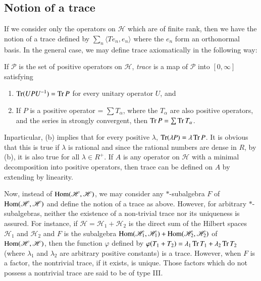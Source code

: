 \subsection{Notion of a trace}\label{partIII-chap3-sec3.4}%

If we consider only the operators on $\mathscr{H}$ which are of finite
rank, then we have the notion of a trace defined by
$\sum_{n} \langle Te_n, e_n \rangle$  where the $e_n$ form
an orthonormal basis. In the general case, we may define trace
axiomatically in the following way: 

\begin{defi*}%
If $\mathscr{P}$ is the set of positive operators on $\mathscr{H}$,
{\em trace} is a map of $\mathscr{P}$ into $[0,\infty]$ satisfying  
\begin{enumerate}
\renewcommand{\theenumi}{\alph{enumi}}
\renewcommand{\labelenumi}{(\theenumi)}
\item $\operatorname{Tr}(UPU^{-1})= \operatorname{Tr} P$ for every unitary operator  $U$, and 

\item If $P$ is a positive operator = $\sum T_\alpha$, where the
  $T_{\alpha}$ are also positive operators, and the series in strongly
  convergent, then   $\operatorname{Tr} P=\sum \operatorname{Tr} T_\alpha$. 
\end{enumerate}
\end{defi*}

In\pageoriginale particular, (b) implies that for every positive $\lambda$,
$\operatorname{Tr}(\lambda P)=\lambda \operatorname{Tr} P$. It is obvious that this is true if
$\lambda$  is rational and since the rational numbers are dense in $R$,
by (b), it is also true for all  $\lambda\in R^+$. If $A$ is any operator
on $\mathscr{H}$ with a minimal decomposition into positive operators,
then trace can be defined on $A$ by extending by linearity. 

Now, instead of $\operatorname{Hom} (\mathscr{H},\mathscr{H})$, we may consider any 
$*$-subalgebra $F$ of $\operatorname{Hom} (\mathscr{H},\mathscr{H})$ and define the notion
of a trace as above.  However, for arbitrary $*$-subalgebras, neither
the existence of a non-trivial trace nor its uniqueness is assured.
For instance, if $\mathscr{H}=\mathscr{H}_1+\mathscr{H}_2$ is the
direct sum of the Hilbert spaces $\mathscr{H}_1$ and $\mathscr{H}_{2}$
and $F$ is the subalgebra $\operatorname{Hom}
(\mathscr{H}_1,\mathscr{H}_{1})+\operatorname{Hom}(\mathscr{H}_{2},\mathscr{H}_{2})$
  of $\operatorname{Hom}(\mathscr{H},\mathscr{H})$, then the function $\varphi$
  defined by $\varphi(T_{1}+T_{2})=\lambda_{1}\operatorname{Tr} T_{1}+\lambda_{2}\operatorname{Tr}
  T_{2}$ (where $\lambda_1$
and $\lambda_2 $ are arbitrary positive constants) is a trace.
However, when $F$ is a factor, the nontrivial trace, if it exists,
is unique.  Those factors which do not possess a nontrivial trace are
said to be of type III.  


